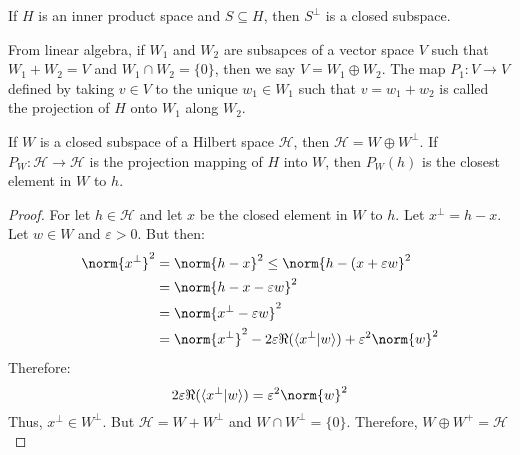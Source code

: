         \begin{theorem}
            If $H$ is an inner product space and
            $S\subseteq{H}$, then $S^{\perp}$ is a closed
            subspace.
        \end{theorem}
        From linear algebra, if $W_{1}$ and $W_{2}$ are
        subsapces of a vector space $V$ such that
        $W_{1}+W_{2}=V$ and $W_{1}\cap{W}_{2}=\{0\}$, then
        we say $V=W_{1}\oplus{W}_{2}$. The map
        $P_{1}:V\rightarrow{V}$ defined by taking $v\in{V}$ to
        the unique $w_{1}\in{W}_{1}$ such that
        $v=w_{1}+w_{2}$ is called the projection of $H$
        onto $W_{1}$ along $W_{2}$.
        \begin{theorem}
            If $W$ is a closed subspace of a Hilbert space
            $\mathcal{H}$, then
            $\mathcal{H}=W\oplus{W}^{\perp}$. If
            $P_{W}:\mathcal{H}\rightarrow\mathcal{H}$ is the
            projection mapping of $H$ into $W$, then
            $P_{W}(h)$ is the closest element in $W$ to $h$.
        \end{theorem}
        \begin{proof}
            For let $h\in\mathcal{H}$ and let $x$ be the
            closed element in $W$ to $h$. Let
            $x^{\perp}=h-x$. Let $w\in{W}$ and
            $\varepsilon>0$. But then:
            \begin{subequations}
                \begin{align}
                    \norm{x^{\perp}}^{2}
                    &=\norm{h-x}^{2}\leq
                    \norm{h-(x+\varepsilon{w}}^{2}\\
                    &=\norm{h-x-\varepsilon{w}}^{2}\\
                    &=\norm{x^{\perp}-\varepsilon{w}}^{2}\\
                    &=\norm{x^{\perp}}^{2}-
                    2\varepsilon\Re(\langle{x^{\perp}|w}\rangle)
                    +\varepsilon^{2}\norm{w}^{2}
                \end{align}
            \end{subequations}
            Therefore:
            \begin{equation}
                2\varepsilon\Re(\langle{x^{\perp}|w}\rangle)
                =\varepsilon^{2}\norm{w}^{2}
            \end{equation}
            Thus, $x^{\perp}\in{W}^{\perp}$. But
            $\mathcal{H}=W+W^{\perp}$ and
            $W\cap{W}^{\perp}=\{0\}$.
            Therefore, $W\oplus{W}^{+}=\mathcal{H}$
        \end{proof}
